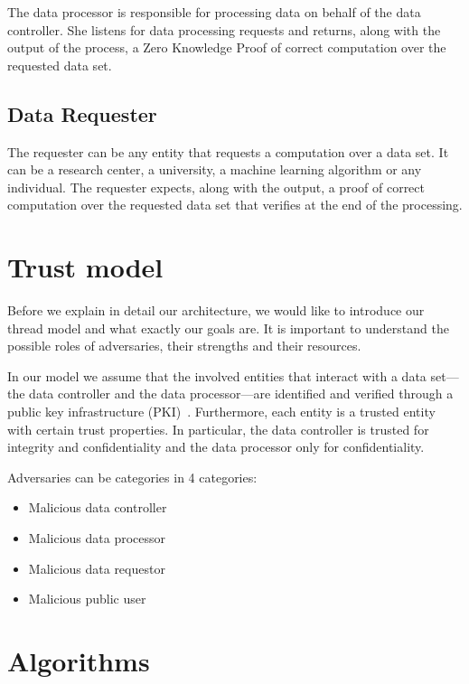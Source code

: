 The data processor is responsible for processing data on behalf of the data controller. She listens for data processing requests and returns, along with the output of the process, a Zero Knowledge Proof of correct computation over the requested data set.

\subsection{Data Requester}
\label{solution:entities:data_req}

The requester can be any entity that requests a computation over a data set. It can be a research center, a university, a machine learning algorithm or any individual. The requester expects, along with the output, a proof of correct computation over the requested data set that verifies at the end of the processing.

\section{Trust model}
\label{solution:trust_model}

Before we explain in detail our architecture, we would like to introduce our thread model and what exactly our goals are. It is important to understand the possible roles of adversaries, their strengths and their resources.

In our model we assume that the involved entities that interact with a data set---the data controller and the data processor---are identified and verified through a public key infrastructure (PKI)~\cite{adams_understanding_2003}. Furthermore, each entity is a trusted entity with certain trust properties. In particular, the data controller is trusted for integrity and confidentiality and the data processor only for confidentiality.

Adversaries can be categories in 4 categories:

\begin{itemize}
  \item Malicious data controller
  \item Malicious data processor
  \item Malicious data requestor
  \item Malicious public user
\end{itemize}

\section{Algorithms}
\label{solution:algorithms}

